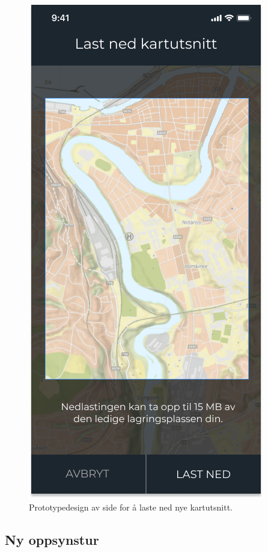 \begin{figure}[H]
\centering
\captionsetup{width=.8\linewidth}
\includegraphics[scale=0.4]{Figurer/Figma/Frame 3 - Last ned kartutsnitt.png}
\caption{Prototypedesign av side for å laste ned nye kartutsnitt.}
\label{fig:figma-laste-ned-kartutsnitt}
\end{figure}

\subsection{Ny oppsynstur}
